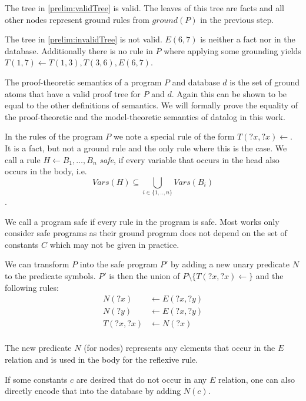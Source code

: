 \begin{example}
    The tree in \cref{prelim:validTree} is valid. The leaves of this tree are facts and all other nodes represent ground rules from $ground(P)$ in the previous step.

    The tree in \cref{prelim:invalidTree} is not valid. $E(6,7)$ is neither a fact nor in the database. Additionally there is no rule in $P$ where applying some grounding yields $T(1,7) \leftarrow T(1,3), T(3,6), E(6,7)$.
\end{example}

The proof-theoretic semantics of a program $P$ and database $d$ is the set of ground atoms that have a valid proof tree for $P$ and $d$. Again this can be shown to be equal to the other definitions of semantics. We will formally prove the equality of the proof-theoretic and the model-theoretic semantics of datalog in this work.

In the rules of the program $P$ we note a special rule of the form $T(?x, ?x) \leftarrow$. It is a fact, but not a ground rule and the only rule where this is the case. 
We call a rule $H \leftarrow B_1, \dots , B_n$ \textit{safe}, if every variable that occurs in the head also occurs in the body, i.e. \[Vars(H) \subseteq \bigcup_{i \in \{1,..,n\} } Vars(B_i) \].

We call a program safe if every rule in the program is safe. Most works only consider safe programs as their ground program does not depend on the set of constants $C$ which may not be given in practice.

\begin{example}
    We can transform $P$ into the safe program $P'$ by adding a new unary predicate $N$ to the predicate symbols. $P'$ is then the union of $P \setminus \{T(?x, ?x) \leftarrow \}$ and the following rules:
    \begin{equation*}
        \begin{split}
            N(?x) &\leftarrow E(?x, ?y) \\
            N(?y) &\leftarrow E(?x, ?y) \\
            T(?x,?x) &\leftarrow N(?x) \\
        \end{split}
    \end{equation*}

    The new predicate $N$ (for nodes) represents any elements that occur in the $E$ relation and is used in the body for the reflexive rule.

    If some constants $c$ are desired that do not occur in any $E$ relation, one can also directly encode that into the database by adding $N(c)$.
\end{example}

